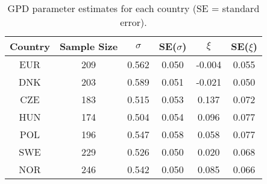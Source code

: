 \begin{table}[!h]
\centering
\caption{GPD parameter estimates for each country (SE = standard error).}
\centering
\begin{tabular}[t]{cccccc}
\toprule
Country & Sample Size & $\sigma$ & SE($\sigma$) & $\xi$ & SE($\xi$)\\
\midrule
EUR & 209 & 0.562 & 0.050 & -0.004 & 0.055\\
DNK & 203 & 0.589 & 0.051 & -0.021 & 0.050\\
CZE & 183 & 0.515 & 0.053 & 0.137 & 0.072\\
HUN & 174 & 0.504 & 0.054 & 0.096 & 0.077\\
POL & 196 & 0.547 & 0.058 & 0.058 & 0.077\\
\addlinespace
SWE & 229 & 0.526 & 0.050 & 0.020 & 0.068\\
NOR & 246 & 0.542 & 0.050 & 0.085 & 0.066\\
\bottomrule
\end{tabular}
\end{table}
